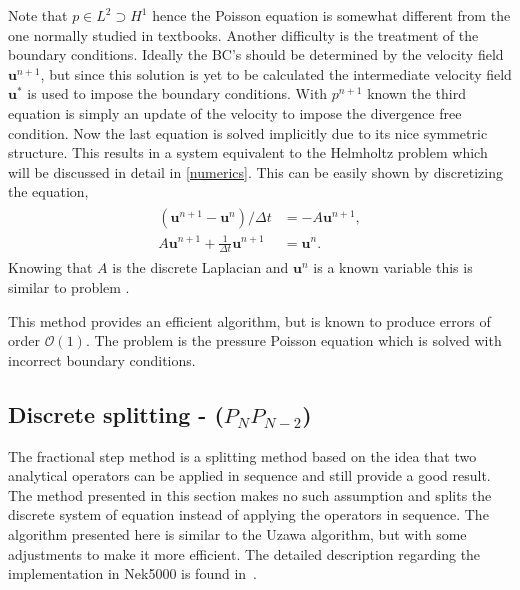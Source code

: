 Note that $p\in L^2\supset H^1$ hence the Poisson equation 
is somewhat different from the one normally studied in textbooks. Another difficulty is the 
treatment of the boundary conditions. Ideally the BC's should be determined by the velocity 
field $\mathbf{u}^{n+1}$, but since this solution is yet to be calculated the intermediate velocity field 
$\mathbf{u}^{*}$ is used to impose the boundary conditions. With $p^{n+1}$ known the third equation is 
simply an update of the velocity to impose the divergence free condition. Now the last
equation is solved implicitly due to its nice symmetric structure. This results in a system 
equivalent to the Helmholtz problem which will be discussed in detail in \cref{numerics}.
This can be easily shown by discretizing the equation, 
\begin{align}
    \begin{split}
    (\mathbf{u}^{n+1}-\mathbf{u}^{n})/\Delta t  &= -A\mathbf{u}^{n+1},\\
    A\mathbf{u}^{n+1}+\frac{1}{\Delta t} \mathbf{u}^{n+1} &= \mathbf{u}^{n}.
    \end{split}
    \label{eq:fracHelm}
\end{align}
Knowing that $A$ is the discrete Laplacian and $\mathbf{u}^n$ is a known variable this is 
similar to problem .


This method provides an efficient algorithm, but is known to produce errors of order
$\mathcal{O}(1)$.
The problem is the pressure Poisson equation which is solved with incorrect boundary 
conditions.

\subsection{Discrete splitting - ($P_NP_{N-2}$)} \label{prescorr}
The fractional step method is a splitting method based on the idea that two analytical 
operators can be applied in sequence and still provide a good result. The method presented 
in this section makes no such assumption and splits the discrete system of equation instead 
of applying the operators in sequence. The algorithm presented here is similar to the Uzawa
algorithm, but with some adjustments to make it more efficient. The detailed 
description regarding the implementation in Nek5000 is found
in~\cite{Fischer_hybridschwarz-multigrid}.

